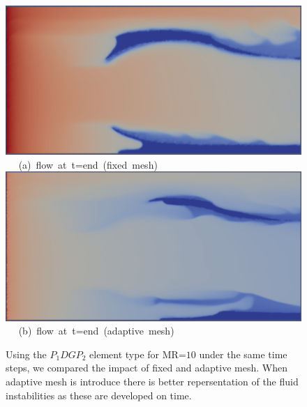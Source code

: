 \begin{figure}[ht] 
\vbox{
\hbox{\hspace{3.5cm}
\includegraphics[width=.5\textwidth]{./Pics1/mr10_5regions_fixed/5regions_fixed_2000.pdf} 
}
\vspace{0.0cm}
\hbox{\hspace{5.0cm} (a) flow at t=end (fixed mesh)   
}
\vspace{0.25cm}
\hbox{\hspace{3.5cm}
\includegraphics[width=.5\textwidth]{./Pics1/mr10_5regions_adapt/5regions_adapt_3000.pdf}
}
\vspace{0.0cm}
\hbox{\hspace{5.0cm} (b) flow at t=end (adaptive mesh)     
}
}     
\caption{Using the $P_{1}DGP_{2}$ element type for MR=$10$ under the same time steps, we compared the impact of fixed and adaptive mesh. When adaptive mesh is introduce there is better repersentation of the fluid instabilities as these are developed on time.}
\label{fig:2testcase_d}
\end{figure}



